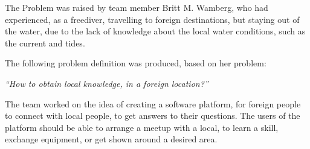 The Problem was raised by team member Britt M. Wamberg, who had experienced, as a freediver, travelling to foreign destinations, but staying out of the water, due to the lack of knowledge about the local water conditions, such as the current and tides.

The following problem definition was produced, based on her problem: 

\begin{center}
\textit{“How to obtain local knowledge, in a foreign location?”}
\end{center}

The team worked on the idea of creating a software platform, for foreign people to connect with local people, to get answers to their questions. The users of the platform should be able to arrange a meetup with a local, to learn a skill, exchange equipment, or get shown around a desired area.

